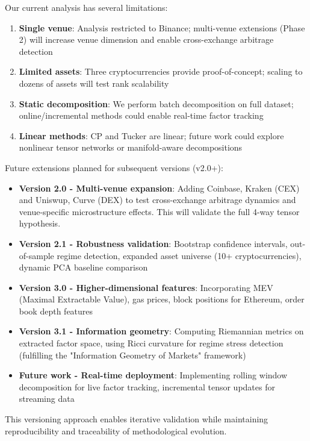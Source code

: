 \documentclass{article}
\begin{document}
Our current analysis has several limitations:

\begin{enumerate}[leftmargin=*]
    \item \textbf{Single venue}: Analysis restricted to Binance; multi-venue extensions (Phase 2) will increase venue dimension and enable cross-exchange arbitrage detection
    \item \textbf{Limited assets}: Three cryptocurrencies provide proof-of-concept; scaling to dozens of assets will test rank scalability
    \item \textbf{Static decomposition}: We perform batch decomposition on full dataset; online/incremental methods could enable real-time factor tracking
    \item \textbf{Linear methods}: CP and Tucker are linear; future work could explore nonlinear tensor networks or manifold-aware decompositions
\end{enumerate}

Future extensions planned for subsequent versions (v2.0+):

\begin{itemize}[leftmargin=*]
    \item \textbf{Version 2.0 - Multi-venue expansion}: Adding Coinbase, Kraken (CEX) and Uniswup, Curve (DEX) to test cross-exchange arbitrage dynamics and venue-specific microstructure effects. This will validate the full 4-way tensor hypothesis.
    \item \textbf{Version 2.1 - Robustness validation}: Bootstrap confidence intervals, out-of-sample regime detection, expanded asset universe (10+ cryptocurrencies), dynamic PCA baseline comparison
    \item \textbf{Version 3.0 - Higher-dimensional features}: Incorporating MEV (Maximal Extractable Value), gas prices, block positions for Ethereum, order book depth features
    \item \textbf{Version 3.1 - Information geometry}: Computing Riemannian metrics on extracted factor space, using Ricci curvature for regime stress detection (fulfilling the "Information Geometry of Markets" framework)
    \item \textbf{Future work - Real-time deployment}: Implementing rolling window decomposition for live factor tracking, incremental tensor updates for streaming data
\end{itemize}

This versioning approach enables iterative validation while maintaining reproducibility and traceability of methodological evolution.
\end{document}
